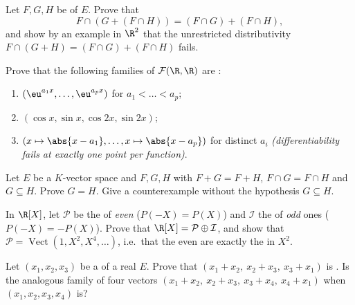 \begin{exercise}[$\star\star$]\label{exo:b1:vspaces:7}
Let $F, G, H$ be  of $E$. Prove that
\[
F \cap (G + (F \cap H)) = (F \cap G) + (F \cap H),
\]
and show by an example in $\R^2$ that the unrestricted
distributivity $F \cap (G + H) = (F\cap G) + (F \cap H)$ fails.
\end{exercise}

\begin{exercise}[$\star\star\star$]\label{exo:b1:vspaces:8}
Prove that the following families of $\mathcal{F}(\R, \R)$ are :
\begin{enumerate}
  \item $(\eu^{a_1 x}, \dots, \eu^{a_p x})$ for $a_1 < \dots < a_p$;
  \item $(\cos x, \sin x, \cos 2x, \sin 2x)$;
  \item $(x \mapsto \abs{x - a_1}, \dots, x \mapsto \abs{x - a_p})$
        for distinct $a_i$ \emph{(differentiability fails at exactly
        one point per function)}.
\end{enumerate}
\end{exercise}

\begin{exercise}[$\star\star\star$]\label{exo:b1:vspaces:9}
Let $E$ be a $K$-vector space and $F, G, H$  with $F + G =
F + H$, $F \cap G = F \cap H$ and $G \subseteq H$. Prove $G = H$.
Give a counterexample without the hypothesis $G \subseteq H$.
\end{exercise}

\begin{exercise}[$\star\star$]\label{exo:b1:vspaces:10}
In $\R[X]$, let $\mathcal P$ be the  of \emph{even} 
($P(-X) = P(X)$) and $\mathcal I$ the  of \emph{odd} ones
($P(-X) = -P(X)$). Prove that $\R[X] = \mathcal P \oplus \mathcal
I$, and show that $\mathcal P =
\operatorname{Vect}(1, X^2, X^4, \dots)$, i.e.\ that the even
 are exactly the  in $X^2$.
\end{exercise}

\begin{exercise}[$\star\star$]\label{exo:b1:vspaces:11}
Let $(x_1, x_2, x_3)$ be a  of a real  $E$.
Prove that $(x_1 + x_2,\ x_2 + x_3,\ x_3 + x_1)$ is . Is the
analogous family of four vectors $(x_1 + x_2,\ x_2 + x_3,\ x_3 +
x_4,\ x_4 + x_1)$  when $(x_1, x_2, x_3, x_4)$ is?
\end{exercise}

